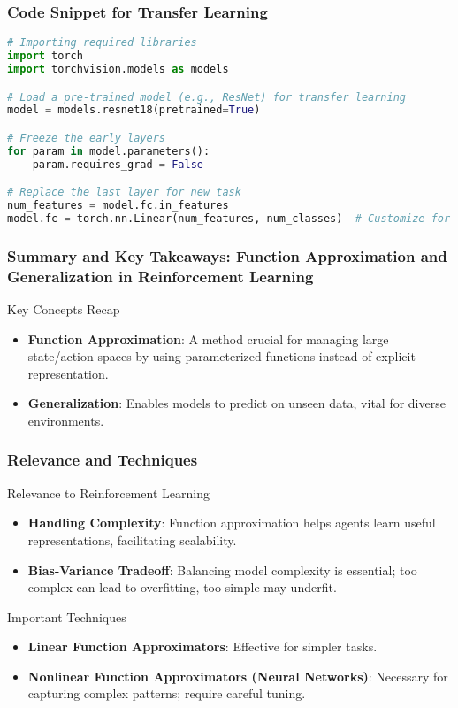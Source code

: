 \documentclass[aspectratio=169]{beamer}
\begin{document}
\begin{frame}[fragile]
  \frametitle{Code Snippet for Transfer Learning}
  \begin{lstlisting}[language=Python]
# Importing required libraries
import torch
import torchvision.models as models

# Load a pre-trained model (e.g., ResNet) for transfer learning
model = models.resnet18(pretrained=True)

# Freeze the early layers
for param in model.parameters():
    param.requires_grad = False

# Replace the last layer for new task
num_features = model.fc.in_features
model.fc = torch.nn.Linear(num_features, num_classes)  # Customize for new number of classes
  \end{lstlisting}
\end{frame}

\begin{frame}[fragile]
    \frametitle{Summary and Key Takeaways: Function Approximation and Generalization in Reinforcement Learning}
    \begin{block}{Key Concepts Recap}
        \begin{itemize}
            \item \textbf{Function Approximation}: A method crucial for managing large state/action spaces by using parameterized functions instead of explicit representation.
            \item \textbf{Generalization}: Enables models to predict on unseen data, vital for diverse environments.
        \end{itemize}
    \end{block}
\end{frame}

\begin{frame}[fragile]
    \frametitle{Relevance and Techniques}
    \begin{block}{Relevance to Reinforcement Learning}
        \begin{itemize}
            \item \textbf{Handling Complexity}: Function approximation helps agents learn useful representations, facilitating scalability.
            \item \textbf{Bias-Variance Tradeoff}: Balancing model complexity is essential; too complex can lead to overfitting, too simple may underfit.
        \end{itemize}
    \end{block}
    
    \begin{block}{Important Techniques}
        \begin{itemize}
            \item \textbf{Linear Function Approximators}: Effective for simpler tasks.
            \item \textbf{Nonlinear Function Approximators (Neural Networks)}: Necessary for capturing complex patterns; require careful tuning.
        \end{itemize}
    \end{block}
\end{frame}
\end{document}
